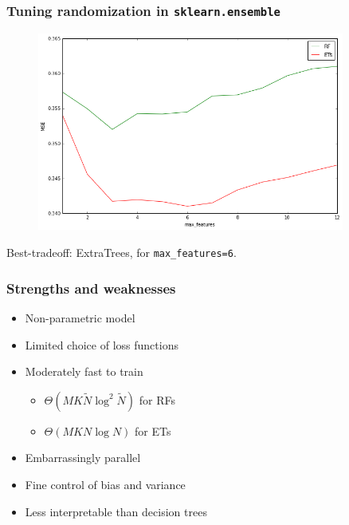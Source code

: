 \documentclass{beamer}
\begin{document}
\begin{frame}[fragile]
\frametitle{Tuning randomization in \texttt{sklearn.ensemble}}

    \begin{figure}
        \includegraphics[width=0.9\textwidth]{./figures/randomness.png}
    \end{figure}

Best-tradeoff: ExtraTrees, for \texttt{max\_features=6}.
\end{frame}


\begin{frame}
  \frametitle{Strengths and weaknesses}

  \begin{itemize}
    \item {\color{blue} Non-parametric} model

    \vspace{0.25cm}

    \item {\color{red}Limited choice} of loss functions

    \vspace{0.25cm}

    \item Moderately fast to train
        \begin{itemize}
            \item $\Theta(MK\widetilde{N}\log^2 \widetilde{N})$ for RFs
            \item $\Theta(MKN\log N)$ for ETs
        \end{itemize}

    \vspace{0.25cm}

    \item Embarrassingly {\color{blue} parallel}

    \vspace{0.25cm}

    \item {\color{blue}Fine control} of bias and variance

    \vspace{0.25cm}

    \item {\color{red} Less interpretable} than decision trees
  \end{itemize}
\end{frame}
\end{document}
